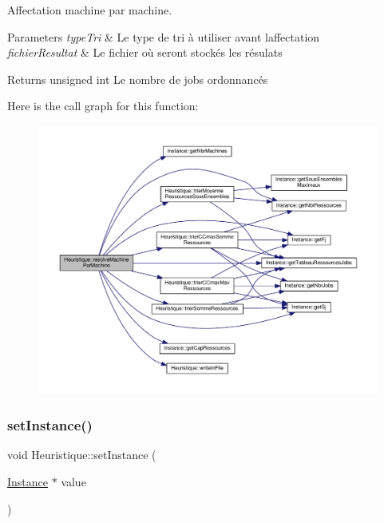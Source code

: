 Affectation machine par machine. 


\begin{DoxyParams}{Parameters}
{\em type\+Tri} & Le type de tri à utiliser avant l\textquotesingle{}affectation \\
\hline
{\em fichier\+Resultat} & Le fichier où seront stockés les résulats \\
\hline
\end{DoxyParams}
\begin{DoxyReturn}{Returns}
unsigned int Le nombre de jobs ordonnancés 
\end{DoxyReturn}
Here is the call graph for this function\+:\nopagebreak
\begin{figure}[H]
\begin{center}
\leavevmode
\includegraphics[width=350pt]{classHeuristique_ad8a57ed34b0c46f6d65e501ee99da498_cgraph}
\end{center}
\end{figure}
\mbox{\label{classHeuristique_ab181d69cd0e2c8a7a28ac5fd9be0e214}} 
\subsubsection{\texorpdfstring{set\+Instance()}{setInstance()}}
{\footnotesize\ttfamily void Heuristique\+::set\+Instance (\begin{DoxyParamCaption}\item[{\hyperlink{classInstance}{Instance} $\ast$}]{value }\end{DoxyParamCaption})}


